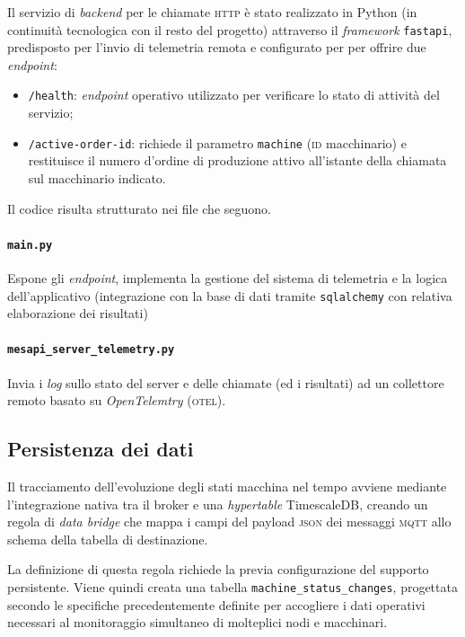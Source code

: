 \documentclass[12pt]{article}
\begin{document}
    Il servizio di \textit{backend}  per le chiamate \textsc{http} è stato realizzato in Python  (in continuità tecnologica con il resto del progetto) attraverso il \textit{framework} \verb|fastapi|, predisposto per l'invio di telemetria remota e configurato per per offrire due \textit{endpoint}:
    \begin{itemize}
         \item \verb|/health|: \textit{endpoint} operativo utilizzato per verificare lo stato di attività del servizio;
         \item \verb|/active-order-id|: richiede il parametro \verb|machine| (\textsc{id} macchinario) e restituisce il numero d'ordine di produzione attivo all'istante della chiamata sul macchinario indicato.
    \end{itemize}

    Il codice risulta strutturato nei file che seguono.
    
    \paragraph{\texttt{main.py}} Espone gli \textit{endpoint}, implementa la gestione del sistema di telemetria e la logica dell'applicativo (integrazione con la base di dati tramite \verb|sqlalchemy| con relativa elaborazione dei risultati)

    \paragraph{\texttt{mesapi\_server\_telemetry.py}} Invia i \textit{log} sullo stato del server e delle chiamate (ed i risultati) ad un collettore remoto basato su \textit{OpenTelemtry} (\textsc{otel}).

    \subsection{Persistenza dei dati}
    
    Il tracciamento dell'evoluzione degli stati macchina nel tempo avviene mediante l'integrazione nativa tra il broker e una \textit{hypertable} TimescaleDB, creando un regola di \textit{data bridge} che mappa i campi del payload \textsc{json} dei messaggi \textsc{mqtt} allo schema della tabella di destinazione.

    La definizione di questa regola richiede la previa configurazione del supporto persistente. Viene quindi creata una tabella \verb|machine_status_changes|, progettata secondo le specifiche precedentemente definite per accogliere i dati operativi necessari al monitoraggio simultaneo di molteplici nodi e macchinari.
    
\end{document}

